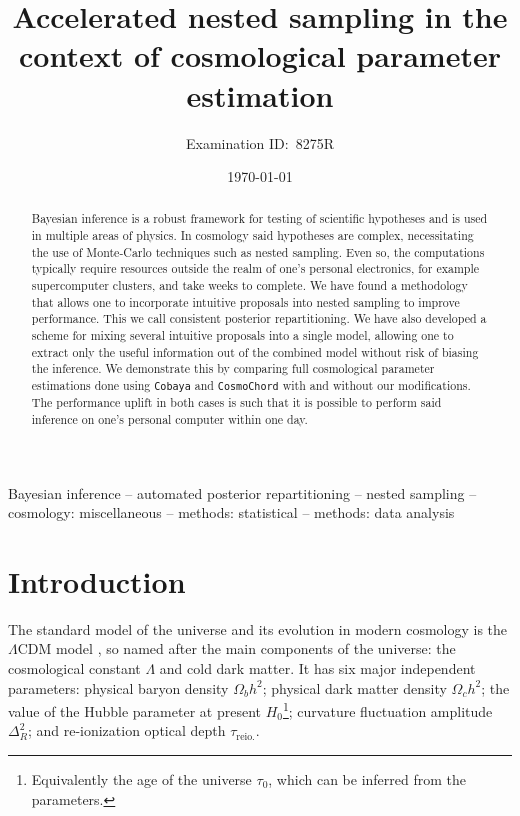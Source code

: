\documentclass[usenatbib]{mnras}
\author[8275R]{Examination ID:~8275R}
\date{\today}
\title[Accelerated Nested Sampling]{Accelerated nested sampling in the context of cosmological parameter estimation}
\begin{document}
\maketitle
\begin{abstract}
  Bayesian inference is a robust framework for testing of scientific
  hypotheses and is used in multiple areas of physics. In cosmology
  said hypotheses are complex, necessitating the use of Monte-Carlo
  techniques such as nested sampling. Even so, the computations
  typically require resources outside the realm of one's personal
  electronics, for example supercomputer clusters, and take weeks to
  complete. We have found a methodology that allows one to incorporate
  intuitive proposals into nested sampling to improve performance. This
  we call consistent posterior repartitioning. We have also developed
  a scheme for mixing several intuitive proposals into a single model,
  allowing one to extract only the useful information out of the
  combined model without risk of biasing the inference. We demonstrate
  this by comparing full cosmological parameter estimations done using
  \texttt{Cobaya} and \texttt{CosmoChord} with and without our
  modifications. The performance uplift in both cases is such that it
  is possible to perform said inference on one's personal computer
  within one day.
\end{abstract}

\begin{keywords}
Bayesian inference -- automated posterior repartitioning -- nested sampling -- cosmology: miscellaneous -- methods: statistical -- methods: data analysis
\end{keywords}

\section{Introduction}\label{sec:org14413d7}

The standard model of the universe and its evolution in modern
cosmology is the \(\Lambda\)CDM model \citep{Condon2018}, so named
after the main components of the universe: the cosmological constant
\(\Lambda\) and cold dark matter. It has six major independent
parameters: physical baryon density \(\Omega_{b}h^{2}\); physical dark
matter density \(\Omega_{c}h^{2}\); the value of the Hubble parameter
at present \(H_{0}\)\footnote{Equivalently the age of the universe
  \(\tau_0\), which can be inferred from the parameters. }; curvature
fluctuation amplitude \(\Delta_{R}^{2}\); and re-ionization optical
depth \(\tau_\text{reio.}\).
\end{document}
